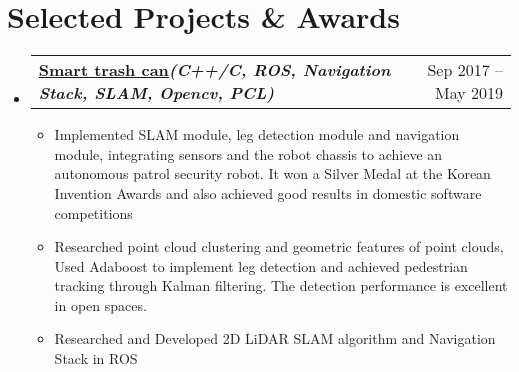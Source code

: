 \documentclass[letterpaper,11pt]{article}
\makeatletter
\newcommand{\resumeItem}[1]{
  \item\small{
    {#1 \vspace{-2pt}}
  }
}
\newcommand{\resumeProjectHeading}[2]{
    \item
    \begin{tabular*}{0.97\textwidth}{l@{\extracolsep{\fill}}r}
      \textbf{#1} & #2 \\
    \end{tabular*}\vspace{-7pt}
}
\newcommand{\resumeSubHeadingListStart}{\begin{itemize}[leftmargin=0.15in, label={}]}
\newcommand{\resumeSubHeadingListEnd}{\end{itemize}}
\newcommand{\resumeItemListStart}{\begin{itemize}}
\newcommand{\resumeItemListEnd}{\end{itemize}\vspace{-5pt}}
\makeatother
\begin{document}
\section{\textbf{Selected Projects \& Awards}}
  \vspace{3pt}
    \resumeSubHeadingListStart

      \resumeProjectHeading
        {\href{https://drive.google.com/file/d/1FCTHbe_6uXDAoiZOx13j0Z9KNvcpPl73/view?usp=sharing}{\color{blue}Smart trash can}\emph{\scriptsize{(C++/C, ROS, Navigation Stack, SLAM, Opencv, PCL)}}}{Sep 2017 -- May 2019}
          \resumeItemListStart
            \resumeItem{Implemented SLAM module, leg detection module and navigation module, integrating sensors and the robot chassis to achieve an autonomous patrol security robot. It won a Silver Medal at the Korean Invention Awards and also achieved good results in domestic software competitions}
            \resumeItem{Researched point cloud clustering and geometric features of point clouds, Used Adaboost to implement leg detection and achieved pedestrian tracking through Kalman filtering. The detection performance is excellent in open spaces.}
            \resumeItem{Researched and Developed 2D LiDAR SLAM algorithm and Navigation Stack in ROS}
          \resumeItemListEnd
    \resumeSubHeadingListEnd

%

\end{document}
